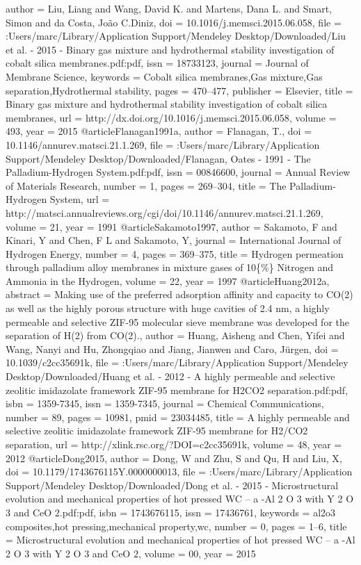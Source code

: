 {author = {Liu, Liang and Wang, David K. and Martens, Dana L. and Smart, Simon and da Costa, Jo{\~{a}}o C.Diniz},
doi = {10.1016/j.memsci.2015.06.058},
file = {:Users/marc/Library/Application Support/Mendeley Desktop/Downloaded/Liu et al. - 2015 - Binary gas mixture and hydrothermal stability investigation of cobalt silica membranes.pdf:pdf},
issn = {18733123},
journal = {Journal of Membrane Science},
keywords = {Cobalt silica membranes,Gas mixture,Gas separation,Hydrothermal stability},
pages = {470--477},
publisher = {Elsevier},
title = {{Binary gas mixture and hydrothermal stability investigation of cobalt silica membranes}},
url = {http://dx.doi.org/10.1016/j.memsci.2015.06.058},
volume = {493},
year = {2015}
}
@article{Flanagan1991a,
author = {Flanagan, T.},
doi = {10.1146/annurev.matsci.21.1.269},
file = {:Users/marc/Library/Application Support/Mendeley Desktop/Downloaded/Flanagan, Oates - 1991 - The Palladium-Hydrogen System.pdf:pdf},
issn = {00846600},
journal = {Annual Review of Materials Research},
number = {1},
pages = {269--304},
title = {{The Palladium-Hydrogen System}},
url = {http://matsci.annualreviews.org/cgi/doi/10.1146/annurev.matsci.21.1.269},
volume = {21},
year = {1991}
}
@article{Sakamoto1997,
author = {Sakamoto, F and Kinari, Y and Chen, F L and Sakamoto, Y},
journal = {International Journal of Hydrogen Energy},
number = {4},
pages = {369--375},
title = {{Hydrogen permeation through palladium alloy membranes in mixture gases of 10{\{}{\%}{\}} Nitrogen and Ammonia in the Hydrogen}},
volume = {22},
year = {1997}
}
@article{Huang2012a,
abstract = {Making use of the preferred adsorption affinity and capacity to CO(2) as well as the highly porous structure with huge cavities of 2.4 nm, a highly permeable and selective ZIF-95 molecular sieve membrane was developed for the separation of H(2) from CO(2).},
author = {Huang, Aisheng and Chen, Yifei and Wang, Nanyi and Hu, Zhongqiao and Jiang, Jianwen and Caro, J{\"{u}}rgen},
doi = {10.1039/c2cc35691k},
file = {:Users/marc/Library/Application Support/Mendeley Desktop/Downloaded/Huang et al. - 2012 - A highly permeable and selective zeolitic imidazolate framework ZIF-95 membrane for H2CO2 separation.pdf:pdf},
isbn = {1359-7345},
issn = {1359-7345},
journal = {Chemical Communications},
number = {89},
pages = {10981},
pmid = {23034485},
title = {{A highly permeable and selective zeolitic imidazolate framework ZIF-95 membrane for H2/CO2 separation}},
url = {http://xlink.rsc.org/?DOI=c2cc35691k},
volume = {48},
year = {2012}
}
@article{Dong2015,
author = {Dong, W and Zhu, S and Qu, H and Liu, X},
doi = {10.1179/1743676115Y.0000000013},
file = {:Users/marc/Library/Application Support/Mendeley Desktop/Downloaded/Dong et al. - 2015 - Microstructural evolution and mechanical properties of hot pressed WC – a -Al 2 O 3 with Y 2 O 3 and CeO 2.pdf:pdf},
isbn = {1743676115},
issn = {17436761},
keywords = {al2o3 composites,hot pressing,mechanical property,wc},
number = {0},
pages = {1--6},
title = {{Microstructural evolution and mechanical properties of hot pressed WC – a -Al 2 O 3 with Y 2 O 3 and CeO 2}},
volume = {00},
year = {2015}
}
